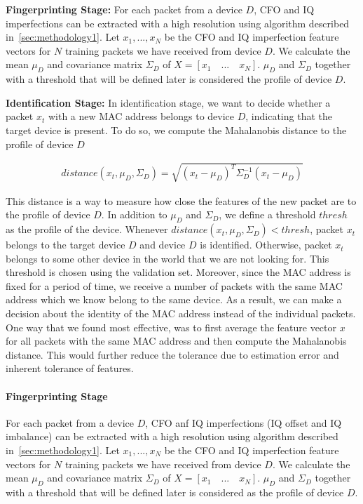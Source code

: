 \vspace{0.5em}
\noindent\textbf{Fingerprinting Stage:} For each packet from a device $D$, CFO and IQ imperfections can be extracted with a high resolution using algorithm described in~\ref{sec:methodology1}. Let $x_1,...,x_N$ be the CFO and IQ imperfection feature vectors for $N$ training packets we have received from device $D$. We calculate the mean $\mu_D$ and covariance matrix $\Sigma_D$ of $X = [x_1 \quad ... \quad x_N]$. $\mu_D$ and $\Sigma_D$ together with a threshold that will be defined later is considered the profile of device $D$.

\noindent\textbf{Identification Stage:} In identification stage, we want to decide whether a packet $x_t$ with a new MAC address belongs to device $D$, indicating that the target device is present. To do so, we compute the Mahalanobis distance to the profile of device $D$

\begin{gather*}
    distance(x_t,\mu_D,\Sigma_D) = \sqrt{(x_t-\mu_D)^T\Sigma_D^{-1}(x_t-\mu_D)}
\end{gather*}


This distance is a way to measure how close the features of the new packet are to the profile of device $D$. In addition to $\mu_D$ and $\Sigma_D$, we define a threshold $thresh$ as the profile of the device. Whenever $distance(x_t,\mu_D,\Sigma_D)<thresh$, packet $x_t$ belongs to the target device $D$ and device $D$ is identified. Otherwise, packet $x_t$ belongs to some other device in the world that we are not looking for. This threshold is chosen using the validation set.
Moreover, since the MAC address is fixed for a period of time, we receive a number of packets with the same MAC address which we know belong to the same device. As a result, we can make a decision about the identity of the MAC address instead of the individual packets. One way that we found most effective, was to first average the feature vector $x$ for all packets with the same MAC address and then compute the Mahalanobis distance. This would further reduce the tolerance due to estimation error and inherent tolerance of features.

\paragraph{Fingerprinting Stage} For each packet from a device $D$, CFO anf IQ imperfections (IQ offset and IQ imbalance) can be extracted with a high resolution using algorithm described in~\ref{sec:methodology1}. Let $x_1,...,x_N$ be the CFO and IQ imperfection feature vectors for $N$ training packets we have received from device $D$. We calculate the mean $\mu_D$ and covariance matrix $\Sigma_D$ of $X = [x_1 \quad ... \quad x_N]$. $\mu_D$ and $\Sigma_D$ together with a threshold that will be defined later is considered as the profile of device $D$.



